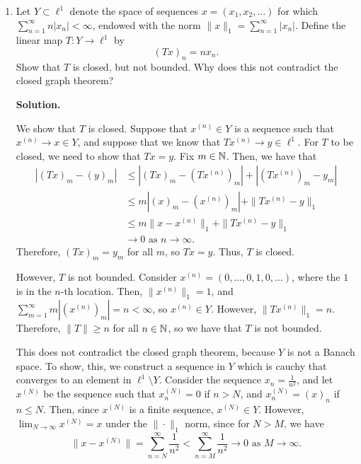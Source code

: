 \documentclass[11pt]{article}
\begin{document}
\begin{enumerate}
This does not contradict the Corollary to the open mapping theorem, because $\ell_{c}$ is not a banach space (that is, it is not complete) w.r.t. the supremum norm.
To see this, consider that the sequence $y^{(n)} = (1, \ldots, \frac{1}{n}, 0, \ldots)$ is Cauchy (indeed, if w.l.o.g. $m > n$, then $\|y^{(n)} - y^{(m)}\| = \sup_{i} |y^{(n)}_i - y^{(m)}_i| = 1 / (n+1)$), but its limit is an infinite sequence, so $\lim_{n \to \infty}y^{(n)} \not\in \ell_{c}$.
Therefore, the requirements of the Open Mapping Theorem that $\mathcal{X}$ and $\mathcal{Y}$ are Banach spaces is not fulfilled, so we can't expect the theorem to hold.

\item Let $Y\subset \ell^1$ denote the space of sequences $x=(x_1,x_2,\ldots)$ for which
$\sum_{n=1}^\infty n|x_n|<\infty$, endowed with the norm
$\|x\|_1=\sum_{n=1}^\infty |x_n|$.
Define the linear map $T:Y\to \ell^1$ by
\[
(Tx)_n = n x_n.
\]
Show that $T$ is closed, but not bounded. Why does this not contradict the closed graph theorem?


\textbf{Solution.}

We show that $T$ is closed.
Suppose that $x^{(n)} \in Y$ is a sequence such that $x^{(n)} \to x \in Y$, and suppose that we know that $Tx^{(n)} \to y \in \ell^{1}$.
For $T$ to be closed, we need to show that $Tx = y$.
Fix $m \in \mathbb{N}$.
Then, we have that
\begin{align*}
    |(Tx)_m - (y)_m| &\leq |(Tx)_m - (Tx^{(n)})_m| + |(Tx^{(n)})_m - y_m|\\
                     &\leq m| (x)_m - (x^{(n)})_m | + \|Tx^{(n)} - y\|_{1}\\
                     &\leq m \|x - x^{(n)}\|_1 + \|Tx^{(n)} - y\|_1\\
                     &\to 0 \text{ as } n \to \infty
.\end{align*}
Therefore, $(Tx)_m = y_m$ for all $m$, so $Tx = y$. Thus, $T$ is closed.

However, $T$ is not bounded.
Consider $x^{(n)} = (0, \ldots,0, 1, 0, \ldots)$, where the $1$ is in the $n$-th location.
Then, $\|x^{(n)}\|_1 = 1$, and $\sum_{m=1}^{\infty}m |(x^{(n)})_m| = n < \infty$, so $x^{(n)} \in Y$.
However, $\|T x^{(n)}\|_1 = n$.
Therefore, $\|T\| \geq n$ for all $n \in \mathbb{N}$, so we have that $T$ is not bounded.

This does not contradict the closed graph theorem, because $Y$ is not a Banach space. To show, this, we construct a sequence in $Y$ which is cauchy that converges to an element in $\ell^{1} \setminus Y$.
Consider the sequence $x_n = \frac{1}{n^2}$, and let $x^{(N)}$ be the sequence such that $x^{(N)}_n = 0$ if $n > N$, and $x^{(N)}_n = (x)_n$ if $n \le N$.
Then, since $x^{(N)}$ is a finite sequence, $x^{(N)} \in Y$.
However, $\lim_{N \to \infty} x^{(N)} = x$ under the $\|\cdot\|_1$ norm, since for $N > M$, we have
\[
\|x - x^{(N)}\| = \sum_{n = N}^{\infty} \frac{1}{n^2} < \sum_{n=M}^{\infty} \frac{1}{n^2} \to 0 \text{ as } M \to \infty
.\] 


\end{enumerate}
\end{document}
